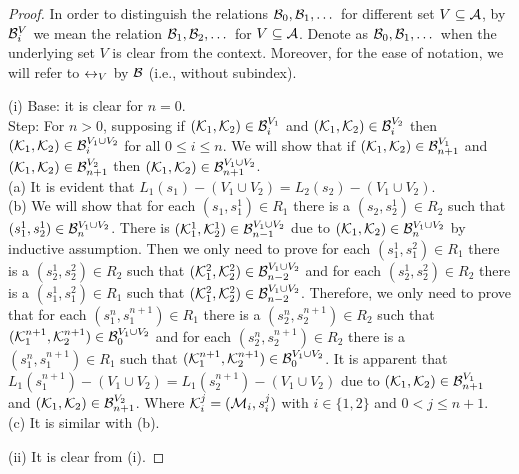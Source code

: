 \documentclass[letterpaper]{article} %
\begin{document}
\begin{proof}
In order to distinguish the relations ${\cal B}_0, {\cal B}_1, \dots$ for different set $V \subseteq {\cal A}$, by ${\cal B}_i^V$ we mean the relation ${\cal B}_1, {\cal B}_2, \dots$ for $V \subseteq {\cal A}$.
Denote as ${\cal B}_0, {\cal B}_1, \dots$ when the underlying set $V$ is clear from the context. Moreover, for the ease of notation, we will refer to $\leftrightarrow_V$ by ${\cal B}$ (i.e., without subindex).

(i) Base: it is clear for $n = 0$.\\
Step: For $n > 0$, supposing if $({\cal K}_1, {\cal K}_2) \in {\cal B}_i^{V_1}$ and $({\cal K}_1, {\cal K}_2) \in {\cal B}_i^{V_2}$ then $({\cal K}_1, {\cal K}_2) \in {\cal B}_i^{V_1 \cup V_2}$ for all $0 \leq i \leq n$. We will show that if $({\cal K}_1, {\cal K}_2) \in {\cal B}_{n+1}^{V_1}$ and $({\cal K}_1, {\cal K}_2) \in {\cal B}_{n+1}^{V_2}$ then $({\cal K}_1, {\cal K}_2) \in {\cal B}_{n+1}^{V_1 \cup V_2}$.\\
(a) It is evident that $L_1(s_1) - (V_1 \cup V_2) = L_2(s_2) - (V_1\cup V_2)$.\\
(b) We will show that for each $(s_1, s_1^1) \in R_1$ there is a $(s_2, s_2^1) \in R_2$ such that $(s_1^1, s_2^1) \in {\cal B}_n^{V_1 \cup V_2}$. There is $({\cal K}_1^1, {\cal K}_2^1) \in {\cal B}_{n-1}^{V_1 \cup V_2}$
due to $({\cal K}_1, {\cal K}_2) \in {\cal B}_n^{V_1 \cup V_2}$ by inductive assumption. Then we only need to prove for each $(s_1^1, s_1^2) \in R_1$ there is a $(s_2^1, s_2^2) \in R_2$ such that $({\cal K}_1^2, {\cal K}_2^2) \in {\cal B}_{n-2}^{V_1 \cup V_2}$ and for each $(s_2^1, s_2^2) \in R_2$ there is a $(s_1^1, s_1^2) \in R_1$ such that $({\cal K}_1^2, {\cal K}_2^2) \in {\cal B}_{n-2}^{V_1 \cup V_2}$. Therefore, we only need to prove that for each $(s_1^n, s_1^{n+1}) \in R_1$ there is a $(s_2^n, s_2^{n+1}) \in R_2$ such that $({\cal K}_1^{n+1}, {\cal K}_2^{n+1}) \in {\cal B}_0^{V_1 \cup V_2}$ and for each $(s_2^n, s_2^{n+1}) \in R_2$ there is a $(s_1^n, s_1^{n+1}) \in R_1$ such that $({\cal K}_1^{n+1}, {\cal K}_2^{n+1}) \in {\cal B}_0^{V_1 \cup V_2}$. It is apparent that $L_1(s_1^{n+1}) - (V_1 \cup V_2) = L_1(s_2^{n+1}) - (V_1 \cup V_2)$ due to $({\cal K}_1, {\cal K}_2) \in {\cal B}_{n+1}^{V_1}$ and $({\cal K}_1, {\cal K}_2) \in {\cal B}_{n+1}^{V_2}$.
Where ${\cal K}_i^j = ({\cal M}_i, s_i^j)$ with $i \in \{1, 2\}$ and $0 < j \leq n+1$.\\
(c) It is similar with (b).

(ii) It is clear from (i).


\end{proof}
\end{document}
